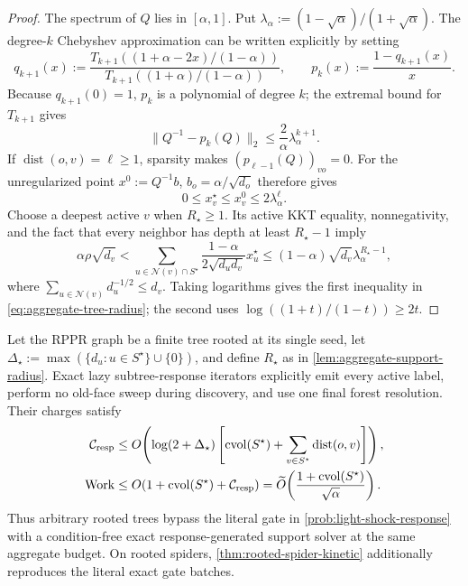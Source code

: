 \begin{proof}
The spectrum of $Q$ lies in $[\alpha,1]$.  Put
$\lambda_\alpha:=(1-\sqrt\alpha)/(1+\sqrt\alpha)$.  The degree-$k$
Chebyshev approximation can be written explicitly by setting
\begin{equation*}
 q_{k+1}(x):=
 \frac{T_{k+1}((1+\alpha-2x)/(1-\alpha))}
      {T_{k+1}((1+\alpha)/(1-\alpha))},
 \qquad p_k(x):=\frac{1-q_{k+1}(x)}x.
\end{equation*}
Because $q_{k+1}(0)=1$, $p_k$ is a polynomial of degree $k$; the extremal
bound for $T_{k+1}$ gives
\begin{equation}
 \|Q^{-1}-p_k(Q)\|_2
 \leq\frac2\alpha\lambda_\alpha^{k+1}.
 \label{eq:aggregate-chebyshev-inverse}
\end{equation}
If $\operatorname{dist}(o,v)=\ell\geq1$, sparsity makes
$(p_{\ell-1}(Q))_{vo}=0$.  For the unregularized point $x^0:=Q^{-1}b$,
$b_o=\alpha/\sqrt{d_o}$ therefore gives
\begin{equation}
 0\leq x_v^\star\leq x_v^0\leq2\lambda_\alpha^\ell.
 \label{eq:aggregate-green-decay}
\end{equation}
Choose a deepest active $v$ when $R_\star\geq1$.  Its active KKT equality,
nonnegativity, and the fact that every neighbor has depth at least
$R_\star-1$ imply
\begin{equation}
 \alpha\rho\sqrt{d_v}
 <\sum_{u\in\mathcal N(v)\cap S^\star}
   \frac{1-\alpha}{2\sqrt{d_ud_v}}x_u^\star
 \leq(1-\alpha)\sqrt{d_v}\lambda_\alpha^{R_\star-1},
 \label{eq:aggregate-deepest-demand}
\end{equation}
where $\sum_{u\in\mathcal N(v)}d_u^{-1/2}\leq d_v$.  Taking logarithms gives
the first inequality in \cref{eq:aggregate-tree-radius}; the second uses
$\log((1+t)/(1-t))\geq2t$.
\end{proof}

\begin{theorem}
\label{thm:aggregate-tree-response}
Let the RPPR graph be a finite tree rooted at its single seed, let
$\Delta_\star:=\max(\{d_u:u\in S^\star\}\cup\{0\})$, and define $R_\star$ as
in \cref{lem:aggregate-support-radius}.  Exact lazy subtree-response iterators
explicitly emit every active label, perform no old-face sweep during
discovery, and use one final forest resolution.  Their charges satisfy
\begin{align}
 \mathcal C_{\rm resp}
 &\leq O\!\left(
  \log(2+\Delta_\star)\left[
   \operatorname{cvol}(S^\star)
   +\sum_{v\in S^\star}\operatorname{dist}(o,v)
  \right]
 \right),
 \label{eq:tree-aggregate-response}\\
 \operatorname{Work}
 &\leq O\!\left(
  1+\operatorname{cvol}(S^\star)+\mathcal C_{\rm resp}
 \right)
 =\widetilde O\!\left(
  \frac{1+\operatorname{cvol}(S^\star)}{\sqrt\alpha}
 \right).
 \label{eq:tree-aggregate-work}
\end{align}
Thus arbitrary rooted trees bypass the literal gate in
\cref{prob:light-shock-response} with a condition-free exact
response-generated support solver at the same aggregate budget.  On rooted
spiders, \cref{thm:rooted-spider-kinetic} additionally reproduces the literal
exact gate batches.
\end{theorem}

